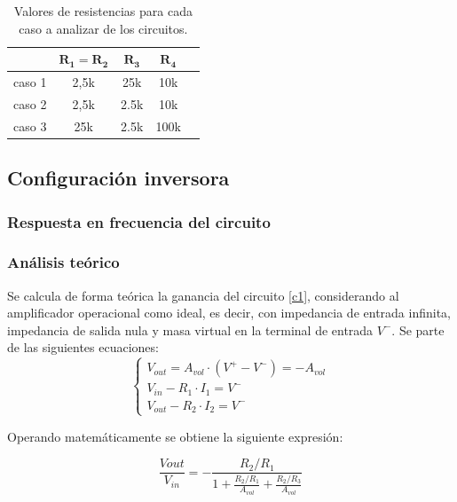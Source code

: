 \begin{table}[h!]
	\centering
	\begin{tabular}{c c c c c}%
		\bfseries  & $\bm{R_1 = R_2}$ & $\bm{R_3}$ & $\bm{R_4}$  \\ \hline
		caso 1 & 2,5k & 25k & 10k \\
		caso 2 & 2,5k & 2.5k & 10k \\
		caso 3 & 25k & 2.5k & 100k \\
		\hline
	\end{tabular}
	\caption{Valores de resistencias para cada caso a analizar de los circuitos.}
	\label{casos}
\end{table}
\subsection{Configuraci\'on inversora}

\subsubsection{Respuesta en frecuencia del circuito}

\subsubsection*{An\'alisis te\'orico} %
Se calcula de forma te\'orica la ganancia del circuito \ref{c1}, considerando al amplificador operacional como ideal, es decir, con impedancia de entrada infinita, impedancia de salida nula y masa virtual en la terminal de entrada $V^{-}$. Se parte de las siguientes ecuaciones:
\begin{equation}
	\begin{cases}
		V_{out} = A_{vol}\cdot(V^+ - V^-) = -A_{vol}\\
		V_{in} - R_1 \cdot I_1 = V^- \\
		V_{out} - R_2 \cdot I_2 = V^- 
	\end{cases}
	\label{ecsbase}
\end{equation}

Operando matem\'aticamente se obtiene la siguiente expresi\'on:

\begin{equation}
	\frac{V{out}}{V_{in}} = - \frac{R_2/R_1}{1 + \frac{R_2/R_1}{A_{vol}} + \frac{R_2/R_3}{A_{vol}}}
	\label{c1vovi}
\end{equation}

